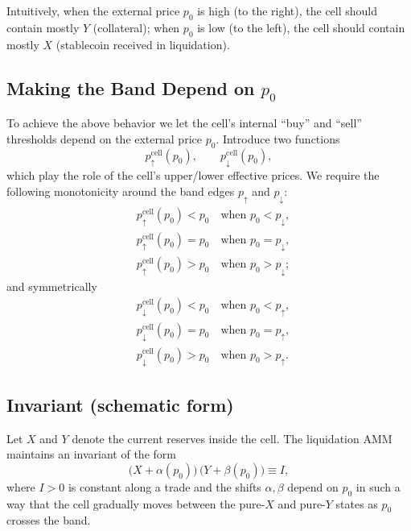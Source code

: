 \documentclass[notitlepage]{revtex4-2}
\begin{document}
Intuitively, when the external price \(p_0\) is high (to the right),
the cell should contain mostly \(Y\) (collateral);
when \(p_0\) is low (to the left), the cell should contain mostly \(X\) (stablecoin received in liquidation).

\subsection*{Making the Band Depend on \(p_0\)}

To achieve the above behavior we let the cell's internal
``buy'' and ``sell'' thresholds depend on the external price \(p_0\).
Introduce two functions
\[
p^{\mathrm{cell}}_{\uparrow}(p_0),\qquad
p^{\mathrm{cell}}_{\downarrow}(p_0),
\]
which play the role of the cell's upper/lower effective prices.  We require the
following monotonicity around the band edges \(p_\uparrow\) and \(p_\downarrow\):
\begin{align*}
& p^{\mathrm{cell}}_{\uparrow}(p_0) < p_0 \quad \text{when } p_0 < p_\downarrow,\\
& p^{\mathrm{cell}}_{\uparrow}(p_0) = p_0 \quad \text{when } p_0 = p_\downarrow,\\
& p^{\mathrm{cell}}_{\uparrow}(p_0) > p_0 \quad \text{when } p_0 > p_\downarrow;
\end{align*}
and symmetrically
\begin{align*}
& p^{\mathrm{cell}}_{\downarrow}(p_0) < p_0 \quad \text{when } p_0 < p_\uparrow,\\
& p^{\mathrm{cell}}_{\downarrow}(p_0) = p_0 \quad \text{when } p_0 = p_\uparrow,\\
& p^{\mathrm{cell}}_{\downarrow}(p_0) > p_0 \quad \text{when } p_0 > p_\uparrow.
\end{align*}

\subsection*{Invariant (schematic form)}

Let \(X\) and \(Y\) denote the current reserves inside the cell.
The liquidation AMM maintains an invariant of the form
\begin{equation}
\label{eq:inv-base}
\bigl(X + \alpha(p_0)\bigr)\,\bigl(Y + \beta(p_0)\bigr) \equiv I,
\end{equation}
where \(I>0\) is constant along a trade and the shifts \(\alpha,\beta\) depend on \(p_0\)
in such a way that the cell gradually moves between the pure-\(X\) and pure-\(Y\) states as \(p_0\)
crosses the band.
\end{document}
